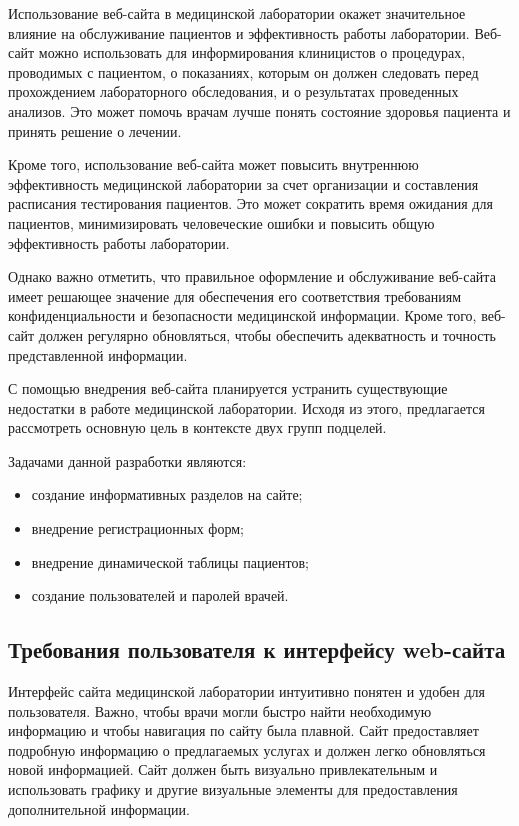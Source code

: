 Использование веб-сайта в медицинской лаборатории окажет значительное влияние на обслуживание пациентов и эффективность работы лаборатории. Веб-сайт можно использовать для информирования клиницистов о процедурах, проводимых с пациентом, о показаниях, которым он должен следовать перед прохождением лабораторного обследования, и о результатах проведенных анализов. Это может помочь врачам лучше понять состояние здоровья пациента и принять решение о лечении.

Кроме того, использование веб-сайта может повысить внутреннюю эффективность медицинской лаборатории за счет организации и составления расписания тестирования пациентов. Это может сократить время ожидания для пациентов, минимизировать человеческие ошибки и повысить общую эффективность работы лаборатории.

Однако важно отметить, что правильное оформление и обслуживание веб-сайта имеет решающее значение для обеспечения его соответствия требованиям конфиденциальности и безопасности медицинской информации. Кроме того, веб-сайт должен регулярно обновляться, чтобы обеспечить адекватность и точность представленной информации.

С помощью внедрения веб-сайта планируется устранить существующие недостатки в работе медицинской лаборатории. Исходя из этого, предлагается рассмотреть основную цель в контексте двух групп подцелей.

Задачами данной разработки являются:
\begin{itemize}
\item создание информативных разделов на сайте;
\item внедрение регистрационных форм;
\item внедрение динамической таблицы пациентов;
\item создание пользователей и паролей врачей.
\end{itemize}

\subsection{Требования пользователя к интерфейсу web-сайта}

Интерфейс сайта медицинской лаборатории интуитивно понятен и удобен для пользователя. Важно, чтобы врачи могли быстро найти необходимую информацию и чтобы навигация по сайту была плавной. Сайт предоставляет подробную информацию о предлагаемых услугах и должен легко обновляться новой информацией. Сайт должен быть визуально привлекательным и использовать графику и другие визуальные элементы для предоставления дополнительной информации.

